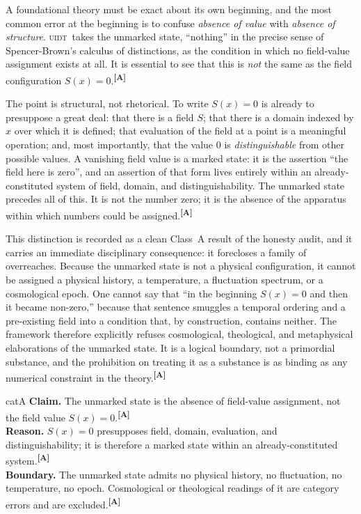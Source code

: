 \documentclass[12pt,a4paper,twoside]{article}
\theoremstyle{plain}
\theoremstyle{definition}
\theoremstyle{remark}
\newcommand{\UIDT}{\textsc{uidt}}
\newcommand{\catmark}[1]{\textsuperscript{\textsf{\textbf{[#1]}}}}
\begin{document}
A foundational theory must be exact about its own beginning, and the most common error at the beginning is to confuse \emph{absence of value} with \emph{absence of structure}. \UIDT\ takes the unmarked state, ``nothing'' in the precise sense of Spencer-Brown's calculus of distinctions, as the condition in which no field-value assignment exists at all. It is essential to see that this is \emph{not} the same as the field configuration $S(x) = 0$.\catmark{A}

The point is structural, not rhetorical. To write $S(x) = 0$ is already to presuppose a great deal: that there is a field $S$; that there is a domain indexed by $x$ over which it is defined; that evaluation of the field at a point is a meaningful operation; and, most importantly, that the value $0$ is \emph{distinguishable} from other possible values. A vanishing field value is a marked state: it is the assertion ``the field here is zero'', and an assertion of that form lives entirely within an already-constituted system of field, domain, and distinguishability. The unmarked state precedes all of this. It is not the number zero; it is the absence of the apparatus within which numbers could be assigned.\catmark{A}

This distinction is recorded as a clean Class~A result of the honesty audit, and it carries an immediate disciplinary consequence: it forecloses a family of overreaches. Because the unmarked state is not a physical configuration, it cannot be assigned a physical history, a temperature, a fluctuation spectrum, or a cosmological epoch. One cannot say that ``in the beginning $S(x)=0$ and then it became non-zero,'' because that sentence smuggles a temporal ordering and a pre-existing field into a condition that, by construction, contains neither. The framework therefore explicitly refuses cosmological, theological, and metaphysical elaborations of the unmarked state. It is a logical boundary, not a primordial substance, and the prohibition on treating it as a substance is as binding as any numerical constraint in the theory.\catmark{A}

\begin{evidencebox}{catA}
\textbf{Claim.} The unmarked state is the absence of field-value assignment, not
the field value $S(x)=0$.\catmark{A}\\[0.3em]
\textbf{Reason.} $S(x)=0$ presupposes field, domain, evaluation, and distinguishability; it is therefore a marked state within an already-constituted
system.\catmark{A}\\[0.3em]
\textbf{Boundary.} The unmarked state admits no physical history, no fluctuation, no temperature, no epoch. Cosmological or theological readings of it are category errors and are excluded.\catmark{A}
\end{evidencebox}
\end{document}
